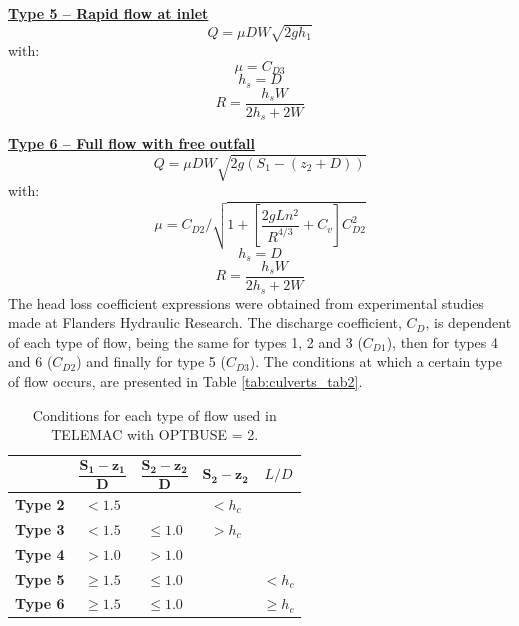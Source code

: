 \underline{\textbf{Type 5 -- Rapid flow at inlet}}\\
\begin{equation}
Q= \mu D W \sqrt{2gh_1}
\end{equation}
with:
\begin{equation}
\mu = C_{D3}
\end{equation}
\begin{equation}
h_s = D
\end{equation}
\begin{equation}
R = \dfrac{h_s W}{2h_s+2W}
\end{equation}

\underline{\textbf{Type 6 -- Full flow with free outfall}}\\
\begin{equation}
Q = \mu D W \sqrt{2g(S_1-(z_2+D))}
\end{equation}
with:
\begin{equation}
\mu = C_{D2}/\sqrt{1+\left[\dfrac{2gLn^2}{R^{4/3}} +C_v \right] C_{D2}^2}
\end{equation}
\begin{equation}
h_s=D
\end{equation}
\begin{equation}
R=\dfrac{h_s W}{2h_s+2W}
\end{equation}
The head loss coefficient expressions were obtained from experimental studies made at 
Flanders Hydraulic Research.
The discharge coefficient, $C_D$, is dependent of each type of flow, being the same for 
types 1, 2 and 3 ($C_{D1}$), then for types 4 and 6 ($C_{D2}$) and finally for type 5 ($C_{D3}$). 
The conditions at which a certain type of flow occurs, 
are presented in Table \ref{tab:culverts_tab2}.

\begin{table}[H]
\caption{Conditions for each type of flow used in TELEMAC with OPTBUSE = 2.}
\label{tab:culvert_tab2}
\begin{center}\begin{tabular}{|c|c|c|c|c|}
\hline
~ & $\mathbf{\dfrac{S_1-z_1}{D}}$ & $\mathbf{\dfrac{S_2-z_2}{D}}$ & $\mathbf{S_2-z_2}$ & $L/D$ \\
\hline
\textbf{Type 2} & $<1.5$    &  ~ & $< h_c$ & ~ \\
\hline
\textbf{Type 3} & $<1.5$    & $\le 1.0$ & $> h_c$ & ~\\
\hline
\textbf{Type 4} & $> 1.0$   & $> 1.0$ & ~ & ~\\
\hline
\textbf{Type 5} & $\ge 1.5$ & $\le 1.0$ & ~ & $< h_c$\\
\hline
\textbf{Type 6} & $\ge 1.5$ & $\le 1.0$  & ~ & $\ge h_c$\\
\hline
\end{tabular}\end{center}
\end{table}

